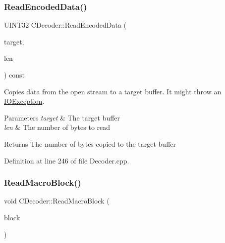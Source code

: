 \subsubsection{\texorpdfstring{ReadEncodedData()}{ReadEncodedData()}}
{\footnotesize\ttfamily U\+I\+N\+T32 C\+Decoder\+::\+Read\+Encoded\+Data (\begin{DoxyParamCaption}\item[{U\+I\+N\+T8 $\ast$}]{target,  }\item[{U\+I\+N\+T32}]{len }\end{DoxyParamCaption}) const}

Copies data from the open stream to a target buffer. It might throw an \mbox{\hyperlink{structIOException}{I\+O\+Exception}}. 
\begin{DoxyParams}{Parameters}
{\em target} & The target buffer \\
\hline
{\em len} & The number of bytes to read \\
\hline
\end{DoxyParams}
\begin{DoxyReturn}{Returns}
The number of bytes copied to the target buffer 
\end{DoxyReturn}


Definition at line 246 of file Decoder.\+cpp.


\begin{DoxyCode}{0}

\end{DoxyCode}
\mbox{\label{classCDecoder_a55cbccabab76500fd47e15332d6b6506}} 
\subsubsection{\texorpdfstring{ReadMacroBlock()}{ReadMacroBlock()}}
{\footnotesize\ttfamily void C\+Decoder\+::\+Read\+Macro\+Block (\begin{DoxyParamCaption}\item[{\mbox{\hyperlink{classCDecoder_1_1CMacroBlock}{C\+Macro\+Block}} $\ast$}]{block }\end{DoxyParamCaption})\hspace{0.3cm}{\ttfamily [private]}}



